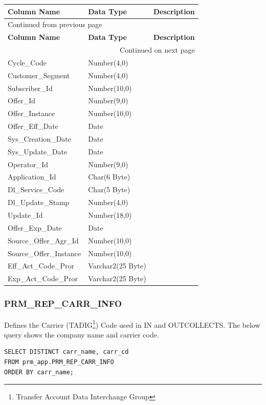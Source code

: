 \documentclass[12pt,twoside]{article}
\begin{document}
\begin{longtable}{l|l|l}
\hline
\textbf{Column Name} & \textbf{Data Type} & \textbf{Description}\\
\hline
\endfirsthead
\multicolumn{3}{l}{Continued from previous page} \\
\hline

\textbf{Column Name} & \textbf{Data Type} & \textbf{Description} \\

\hline
\endhead
\hline\multicolumn{3}{r}{Continued on next page} \\
\endfoot
\endlastfoot
\hline
Cycle\_Code & Number(4,0) & \\
Customer\_Segment & Number(4,0) & \\
Subscriber\_Id & Number(10,0) & \\
Offer\_Id & Number(9,0) & \\
Offer\_Instance & Number(10,0) & \\
Offer\_Eff\_Date & Date & \\
Sys\_Creation\_Date & Date & \\
Sys\_Update\_Date & Date & \\
Operator\_Id & Number(9,0) & \\
Application\_Id & Char(6 Byte) & \\
Dl\_Service\_Code & Char(5 Byte) & \\
Dl\_Update\_Stamp & Number(4,0) & \\
Update\_Id & Number(18,0) & \\
Offer\_Exp\_Date & Date & \\
Source\_Offer\_Agr\_Id & Number(10,0) & \\
Source\_Offer\_Instance & Number(10,0) & \\
Eff\_Act\_Code\_Pror & Varchar2(25 Byte) & \\
Exp\_Act\_Code\_Pror & Varchar2(25 Byte) & \\
\hline
\end{longtable}
\normalsize
\newpage
\subsubsection{PRM\_REP\_CARR\_INFO}
\label{sec:orgheadline105}
Defines the Carrier (TADIG\footnote{Transfer Account Data Interchange Group}) Code used in IN and OUTCOLLECTS.
The below query shows the company name and carrier code.

\begin{verbatim}
SELECT DISTINCT carr_name, carr_cd
FROM prm_app.PRM_REP_CARR_INFO
ORDER BY carr_name;
\end{verbatim}
\end{document}
